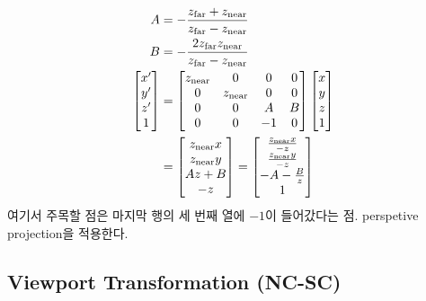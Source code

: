 $$
\begin{aligned}
  A &= -{z_\text{far} + z_\text{near} \over z_\text{far} - z_\text{near}} \\
  B &= -{2z_\text{far} z_\text{near} \over z_\text{far} - z_\text{near}} \\
  \begin{bmatrix}
    x^\prime \\
    y^\prime \\
    z^\prime \\
    1
  \end{bmatrix}
  &=
  \begin{bmatrix}
    z_\text{near} & 0 & 0 & 0 \\
    0 & z_\text{near} & 0 & 0 \\
    0 & 0 & A & B \\
    0 & 0 & -1 & 0
  \end{bmatrix}
  \begin{bmatrix}
    x \\
    y \\
    z \\
    1
  \end{bmatrix} \\
  &=
  \begin{bmatrix}
    z_\text{near}x \\
    z_\text{near}y \\
    Az + B \\
    -z
  \end{bmatrix}
  =
  \begin{bmatrix}
    z_\text{near}x \over -z \\
    z_\text{near}y \over -z \\
    -A - {B \over z} \\
    1
  \end{bmatrix}
\end{aligned}
$$
여기서 주목할 점은 마지막 행의 세 번째 열에 $-1$이 들어갔다는 점. perspetive projection을 적용한다.

\subsection{Viewport Transformation (NC-SC)}

